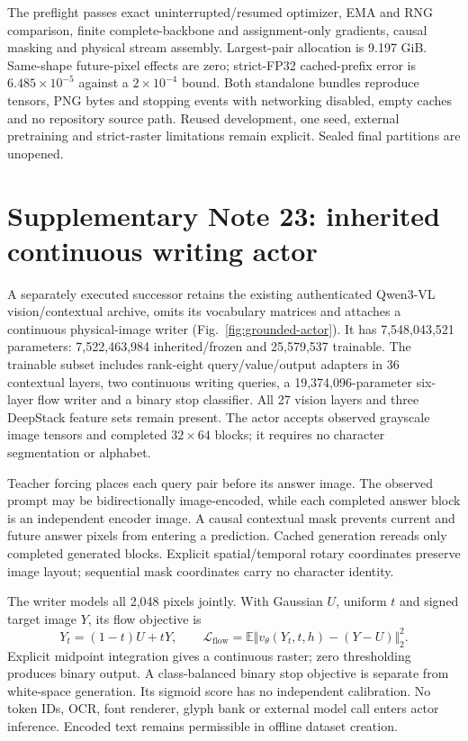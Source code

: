 \documentclass[10pt,a4paper]{article}
\begin{document}
The preflight passes exact uninterrupted/resumed optimizer, EMA and RNG
comparison, finite complete-backbone and assignment-only gradients, causal
masking and physical stream assembly. Largest-pair allocation is 9.197 GiB.
Same-shape future-pixel effects are zero; strict-FP32 cached-prefix error is
$6.485\times10^{-5}$ against a $2\times10^{-4}$ bound. Both standalone bundles
reproduce tensors, PNG bytes and stopping events with networking disabled,
empty caches and no repository source path. Reused development, one seed,
external pretraining and strict-raster limitations remain explicit. Sealed
final partitions are unopened.

\section*{Supplementary Note 23: inherited continuous writing actor}
A separately executed successor retains the existing authenticated Qwen3-VL
vision/contextual archive\cite{qwen3vl}, omits its vocabulary matrices and
attaches a continuous physical-image writer (Fig.~\ref{fig:grounded-actor}).
It has 7,548,043,521 parameters: 7,522,463,984 inherited/frozen and 25,579,537
trainable. The trainable subset includes rank-eight query/value/output
adapters in 36 contextual layers, two continuous writing queries, a
19,374,096-parameter six-layer flow writer and a binary stop classifier.
All 27 vision layers and three DeepStack feature sets remain present.
The actor accepts observed grayscale image tensors and completed
$32\times64$ blocks; it requires no character segmentation or alphabet.

Teacher forcing places each query pair before its answer image. The observed
prompt may be bidirectionally image-encoded, while each completed answer block
is an independent encoder image. A causal contextual mask prevents current
and future answer pixels from entering a prediction. Cached generation
rereads only completed generated blocks. Explicit spatial/temporal rotary
coordinates preserve image layout; sequential mask coordinates carry no
character identity.

The writer models all 2,048 pixels jointly. With Gaussian $U$, uniform $t$ and
signed target image $Y$, its flow objective is
\begin{equation}
 Y_t=(1-t)U+tY,\qquad
 \mathcal L_{\mathrm{flow}}=\mathbb E\Vert v_\theta(Y_t,t,h)-(Y-U)\Vert_2^2.
\end{equation}
Explicit midpoint integration gives a continuous raster; zero thresholding
produces binary output. A class-balanced binary stop objective is separate
from white-space generation. Its sigmoid score has no independent calibration.
No token IDs, OCR, font renderer, glyph bank or external model call enters
actor inference. Encoded text remains permissible in offline dataset creation.
\end{document}
